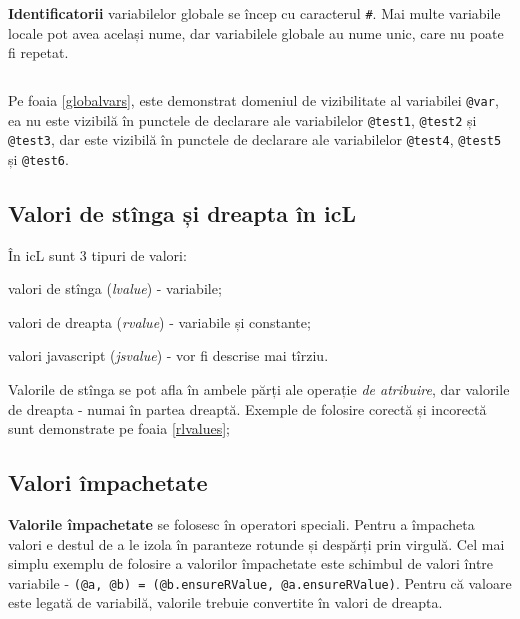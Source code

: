 {\bf Identificatorii} variabilelor globale se încep cu caracterul {\color{blue2}\texttt{#}}. Mai multe variabile locale pot avea același nume, dar variabilele globale au nume unic, care nu poate fi repetat.

\begin{sourcecode}
    \label{localvars}
    \inputminted[linenos]{icl}{../sources/localvars.icL}
\end{sourcecode}

Pe foaia \ref{globalvars}, este demonstrat domeniul de vizibilitate al variabilei \texttt{@var}, ea nu este vizibilă în punctele de declarare ale variabilelor \texttt{@test1}, \texttt{@test2} și \texttt{@test3}, dar este vizibilă în punctele de declarare ale variabilelor \texttt{@test4}, \texttt{@test5} și \texttt{@test6}.

\subsection{Valori de stînga și dreapta în icL}

În icL sunt 3 tipuri de valori:

\begin{icEnum}
\item
	valori de stînga ({\it lvalue}) - variabile;
\item
	valori de dreapta ({\it rvalue}) - variabile și constante;
\item
	valori javascript ({\it jsvalue}) - vor fi descrise mai tîrziu.
\end{icEnum}

Valorile de stînga se pot afla în ambele părți ale operație {\it de atribuire}, dar valorile de dreapta - numai în partea dreaptă. Exemple de folosire corectă și incorectă sunt demonstrate pe foaia \ref{rlvalues};

\subsection{Valori împachetate}

{\bf Valorile împachetate} se folosesc în operatori speciali. Pentru a împacheta valori e destul de a le izola în paranteze rotunde și despărți prin virgulă. Cel mai simplu exemplu de folosire a valorilor împachetate este schimbul de valori între variabile - \texttt{(@a, @b) = (@b.ensureRValue, @a.ensureRValue)}. Pentru că valoare este legată de variabilă, valorile trebuie convertite în valori de dreapta.


